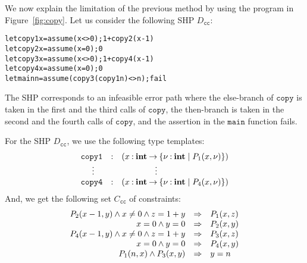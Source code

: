 We now explain the limitation of the previous method by using the 
program in Figure~\ref{fig:copy}.  Let us consider the following SHP 
\(D_{\texttt{cc}}\):
\begin{alltt}
let copy1 x = assume (x<>0); 1 + copy2 (x-1)
let copy2 x = assume (x=0); 0
let copy3 x = assume (x<>0); 1 + copy4 (x-1)
let copy4 x = assume (x=0); 0
let main n = assume (copy3 (copy1 n) <> n); fail
\end{alltt}
The SHP corresponds to an infeasible error path where the else-branch of
\(\texttt{copy}\) is taken in the first and the third calls of
\(\texttt{copy}\), the then-branch is taken in the second and the fourth
calls of \(\texttt{copy}\), and the assertion in the \(\texttt{main}\)
function fails.

For the SHP \(D_{\texttt{cc}}\), we use the following type templates:
\[
\begin{array}{rcl}
\texttt{copy1}&\mathbin{:}&(x\mathbin{:}{\mathbf{int}}\mathbin{\rightarrow}{\{{\nu\mathbin{:}\mathbf{int} \mid P_1(x,\nu)}\}}) \\
\vdots\quad &&\qquad\qquad \vdots \\
\texttt{copy4}&\mathbin{:}&(x\mathbin{:}{\mathbf{int}}\mathbin{\rightarrow}{\{{\nu\mathbin{:}\mathbf{int} \mid P_4(x,\nu)}\}})
\end{array}
\]
And, we get the following set \(C_{\texttt{cc}}\) of constraints:
\[
\begin{array}{rcl}
P_2(x-1,y) \land x\neq0 \land z=1+y &\Rightarrow& P_1(x,z) \\
x=0 \land y=0 &\Rightarrow& P_2(x,y) \\
P_4(x-1,y) \land x\neq0 \land z=1+y &\Rightarrow& P_3(x,z) \\
x=0 \land y=0 &\Rightarrow& P_4(x,y) \\
P_1(n,x) \land P_3(x,y) &\Rightarrow& y=n
\end{array}
\]

